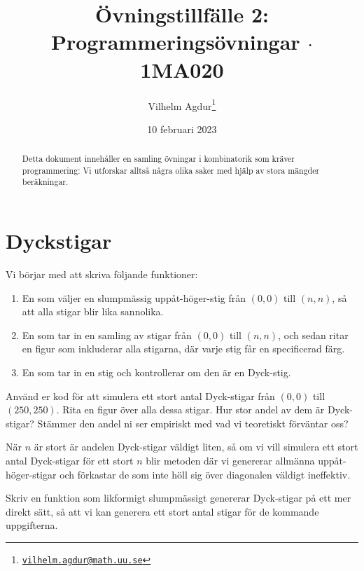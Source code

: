 \documentclass[nobib]{tufte-handout}
\title{Övningstillfälle 2: Programmeringsövningar $\cdot$ 1MA020}
\author[Vilhelm Agdur]{Vilhelm Agdur\thanks{\href{mailto:vilhelm.agdur@math.uu.se}{\nolinkurl{vilhelm.agdur@math.uu.se}}}}
\date{10 februari 2023}
\begin{document}
\maketitle%

\begin{abstract}
\noindent
Detta dokument innehåller en samling övningar i kombinatorik som kräver programmering: Vi utforskar alltså några olika saker med hjälp av stora mängder beräkningar.
\end{abstract}


\section{Dyckstigar}

\begin{xca}
    Vi börjar med att skriva följande funktioner:
    \begin{enumerate}
        \item En som väljer en slumpmässig uppåt-höger-stig från $(0,0)$ till $(n,n)$, så att alla stigar blir lika sannolika.
        \item En som tar in en samling av stigar från $(0,0)$ till $(n,n)$, och sedan ritar en figur som inkluderar alla stigarna, där varje stig får en specificerad färg.
        \item En som tar in en stig och kontrollerar om den är en Dyck-stig.
    \end{enumerate}
\end{xca}

\begin{xca}
    Använd er kod för att simulera ett stort antal Dyck-stigar från $(0,0)$ till $(250,250)$. Rita en figur över alla dessa stigar. Hur stor andel av dem är Dyck-stigar? Stämmer den andel ni ser empiriskt med vad vi teoretiskt förväntar oss?
\end{xca}

\begin{xca}
    När $n$ är stort är andelen Dyck-stigar väldigt liten, så om vi vill simulera ett stort antal Dyck-stigar för ett stort $n$ blir metoden där vi genererar allmänna uppåt-höger-stigar och förkastar de som inte höll sig över diagonalen väldigt ineffektiv.

    Skriv en funktion som likformigt slumpmässigt genererar Dyck-stigar på ett mer direkt sätt, så att vi kan generera ett stort antal stigar för de kommande uppgifterna.
\end{xca}
\end{document}
